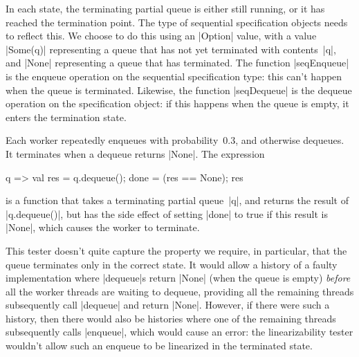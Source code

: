 In each state, the terminating partial queue is either still running, or it
has reached the termination point.  The type of sequential specification
objects needs to reflect this.  We choose to do this using an |Option| value,
with a value |Some(q)| representing a queue that has not yet terminated with
contents~|q|, and |None| representing a queue that has terminated.  The
function |seqEnqueue| is the enqueue operation on the sequential specification
type: this can't happen when the queue is terminated.  Likewise, the function
|seqDequeue| is the dequeue operation on the specification object: if this
happens when the queue is empty, it enters the termination state.

Each worker repeatedly enqueues with probability~$0.3$, and otherwise
dequeues.  It terminates when a dequeue returns |None|.  The expression
\begin{scala}
  q => {val res = q.dequeue(); done = (res == None); res}
\end{scala}
is a function that takes a terminating partial queue~|q|, and returns the
result of |q.dequeue()|, but has the side effect of setting |done| to true
if this result is |None|, which causes the worker to terminate.  

This tester doesn't quite capture the property we require, in particular, that
the queue terminates only in the correct state.  It would allow a history of a
faulty implementation where |dequeue|s return |None| (when the queue is empty)
\emph{before} all the worker threads are waiting to dequeue, providing all the
remaining threads subsequently call |dequeue| and return |None|.
However, if there were such a history, then there would also be histories
where one of the remaining threads subsequently calls |enqueue|, which would
cause an error: the linearizability tester wouldn't allow such an enqueue to
be linearized in the terminated state.
